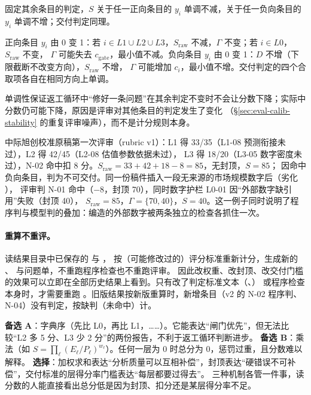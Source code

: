 \begin{proposition}[单调性]
\label{prop:eval-monotone}
固定其余条目的判定，$S$ 关于任一正向条目的 $y_i$ 单调不减，关于任一负向条目的 $y_i$ 单调不增；交付判定同理。
\end{proposition}
\begin{evproof}
正向条目 $y_i$ 由 0 变 1：若 $i\in L1\cup L2\cup L3$，$S_{\mathrm{raw}}$ 不减，$\Gamma$ 不变；若 $i\in L0$，$S_{\mathrm{raw}}$ 不变，
$\Gamma$ 可能失去 $c_{\mathrm{gate}}$，最小值不减。负向条目 $y_i$ 由 0 变 1：$D$ 不增（下限截断不改变方向），$S_{\mathrm{raw}}$ 不增，
$\Gamma$ 可能增加 $c_i$，最小值不增。交付判定的四个合取项各自在相同方向上单调。
\end{evproof}
单调性保证返工循环中“修好一条问题”在其余判定不变时不会让分数下降；实际中分数仍可能下降，原因是评审对其他条目的判定发生了变化
（\S\ref{sec:eval-calib-stability} 的重复评审噪声），而不是计分规则本身。

\begin{example}[一份原稿与一份劣化稿的计分]
\label{ex:eval-score}
中际旭创校准原稿第一次评审（rubric v1）：L1 得 33/35（L1-08 预测衔接未过），L2 得 42/45（L2-08 估值参数依据未过），
L3 得 18/20（L3-05 数字密度未过），N-02 命中扣 8 分。$S_{\mathrm{raw}}=33+42+18-8=85$，无封顶，$S=85$；
因命中负向条目，判为不可交付。同一份稿件插入一段无来源的市场规模数字后（劣化 ），
评审判 N-01 命中（$-8$，封顶 70），同时数字护栏 L0-01 因“外部数字缺引用”失败（封顶 40），
$S_{\mathrm{raw}}=85$，$\Gamma=\{70,40\}$，$S=40$。这一例子同时说明了程序判与模型判的叠加：编造的外部数字被两条独立的检查各抓住一次。
\end{example}

\paragraph{重算不重评。}
 读结果目录中已保存的  与 ，
按（可能修改过的）评分标准重新计分，生成新的 、 与问题单，不重跑程序检查也不重跑评审。
因此改权重、改封顶、改交付门槛的效果可以立即在全部历史结果上看到。只有改了判定标准文本（、）
或程序检查本身时，才需要重跑 。旧版结果按新版重算时，新增条目（v2 的 N-02 程序判、N-04）没有判定，按缺判（未命中）计。

\begin{tradeoff}
\textbf{备选 A}：字典序（先比 L0，再比 L1，……）。它能表达“闸门优先”，但无法比较“L2 多 5 分、L3 少 2 分”的两份报告，不利于返工循环判断进步。
\textbf{备选 B}：乘法（如 $S=\prod_\ell (E_\ell/P_\ell)^{w_\ell}$）。任何一层为 0 时总分为 0，惩罚过重，且分数难以解释。
\textbf{选择}：加权求和表达“分析质量可以互相补偿”，封顶表达“硬错误不可补偿”，交付标准的层得分率门槛表达“每层都要过得去”。
三种机制各管一件事，读分数的人能直接看出总分低是因为封顶、扣分还是某层得分率不足。
\end{tradeoff}

